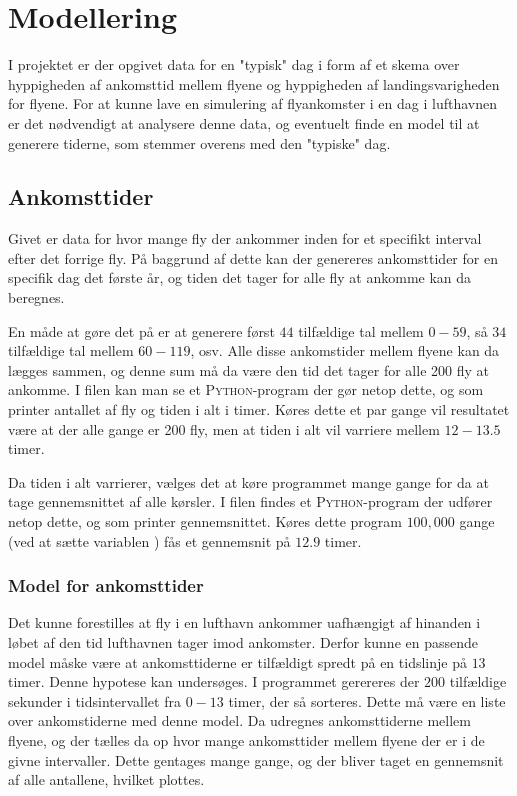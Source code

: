 \chapter{Modellering}
I projektet er der opgivet data for en "typisk" dag i form af et skema over hyppigheden af ankomsttid mellem flyene og hyppigheden af landingsvarigheden for flyene. For at kunne lave en simulering af flyankomster i en dag i lufthavnen er det nødvendigt at analysere denne data, og eventuelt finde en model til at generere tiderne, som stemmer overens med den "typiske" dag.
\section{Ankomsttider}
Givet er data for hvor mange fly der ankommer inden for et specifikt interval efter det forrige fly. På baggrund af dette kan der genereres ankomsttider for en specifik dag det første år, og tiden det tager for alle fly at ankomme kan da beregnes.

En måde at gøre det på er at generere først $44$ tilfældige tal mellem $0 - 59$, så $34$ tilfældige tal mellem $60 - 119$, osv. Alle disse ankomstider mellem flyene kan da lægges sammen, og denne sum må da være den tid det tager for alle 200 fly at ankomme.
I filen  kan man se et \textsc{Python}-program der gør netop dette, og som printer antallet af fly og tiden i alt i timer.
Køres dette et par gange vil resultatet være at der alle gange er 200 fly, men at tiden i alt vil varriere mellem $12 - 13.5$ timer.

Da tiden i alt varrierer, vælges det at køre programmet mange gange for da at tage gennemsnittet af alle kørsler.
I filen  findes et \textsc{Python}-program der udfører netop dette, og som printer gennemsnittet. Køres dette program $100,000$ gange (ved at sætte variablen ) fås et gennemsnit på $12.9$ timer.

\subsection{Model for ankomsttider} \label{chap:model_arrival_times}
Det kunne forestilles at fly i en lufthavn ankommer uafhængigt af hinanden i løbet af den tid lufthavnen tager imod ankomster.
Derfor kunne en passende model måske være at ankomsttiderne er tilfældigt spredt på en tidslinje på $13$ timer.
Denne hypotese kan undersøges.
I programmet  gerereres der $200$ tilfældige sekunder i tidsintervallet fra $0 - 13$ timer, der så sorteres. Dette må være en liste over ankomstiderne med denne model.
Da udregnes ankomsttiderne mellem flyene, og der tælles da op hvor mange ankomsttider mellem flyene der er i de givne intervaller.
Dette gentages mange gange, og der bliver taget en gennemsnit af alle antallene, hvilket plottes.

